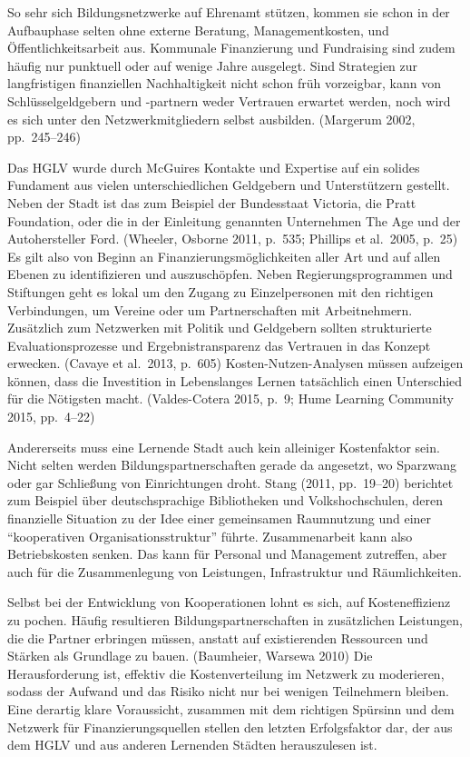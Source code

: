 \documentclass[a4paper,
fontsize=11pt,
oneside,
numbers=noperiodatend,
parskip=half-,
bibliography=totoc,
final
]{scrartcl}
\begin{document}
So sehr sich Bildungsnetzwerke auf Ehrenamt stützen, kommen sie schon in
der Aufbauphase selten ohne externe Beratung, Managementkosten, und
Öffentlichkeitsarbeit aus. Kommunale Finanzierung und Fundraising sind
zudem häufig nur punktuell oder auf wenige Jahre ausgelegt. Sind
Strategien zur langfristigen finanziellen Nachhaltigkeit nicht schon
früh vorzeigbar, kann von Schlüsselgeldgebern und -partnern weder
Vertrauen erwartet werden, noch wird es sich unter den
Netzwerkmitgliedern selbst ausbilden. (Margerum 2002, pp.~245--246)

Das HGLV wurde durch McGuires Kontakte und Expertise auf ein solides
Fundament aus vielen unterschiedlichen Geldgebern und Unterstützern
gestellt. Neben der Stadt ist das zum Beispiel der Bundesstaat Victoria,
die Pratt Foundation, oder die in der Einleitung genannten Unternehmen
The Age und der Autohersteller Ford. (Wheeler, Osborne 2011, p.~535;
Phillips et al.~2005, p.~25) Es gilt also von Beginn an
Finanzierungsmöglichkeiten aller Art und auf allen Ebenen zu
identifizieren und auszuschöpfen. Neben Regierungsprogrammen und
Stiftungen geht es lokal um den Zugang zu Einzelpersonen mit den
richtigen Verbindungen, um Vereine oder um Partnerschaften mit
Arbeitnehmern. Zusätzlich zum Netzwerken mit Politik und Geldgebern
sollten strukturierte Evaluationsprozesse und Ergebnistransparenz das
Vertrauen in das Konzept erwecken. (Cavaye et al.~2013, p.~605)
Kosten-Nutzen-Analysen müssen aufzeigen können, dass die Investition in
Lebenslanges Lernen tatsächlich einen Unterschied für die Nötigsten
macht. (Valdes-Cotera 2015, p.~9; Hume Learning Community 2015,
pp.~4--22)

Andererseits muss eine Lernende Stadt auch kein alleiniger Kostenfaktor
sein. Nicht selten werden Bildungspartnerschaften gerade da angesetzt,
wo Sparzwang oder gar Schließung von Einrichtungen droht. Stang (2011,
pp.~19--20) berichtet zum Beispiel über deutschsprachige Bibliotheken
und Volkshochschulen, deren finanzielle Situation zu der Idee einer
gemeinsamen Raumnutzung und einer \enquote{kooperativen
Organisationsstruktur} führte. Zusammenarbeit kann also Betriebskosten
senken. Das kann für Personal und Management zutreffen, aber auch für
die Zusammenlegung von Leistungen, Infrastruktur und Räumlichkeiten.

Selbst bei der Entwicklung von Kooperationen lohnt es sich, auf
Kosteneffizienz zu pochen. Häufig resultieren Bildungspartnerschaften in
zusätzlichen Leistungen, die die Partner erbringen müssen, anstatt auf
existierenden Ressourcen und Stärken als Grundlage zu bauen. (Baumheier,
Warsewa 2010) Die Herausforderung ist, effektiv die Kostenverteilung im
Netzwerk zu moderieren, sodass der Aufwand und das Risiko nicht nur bei
wenigen Teilnehmern bleiben. Eine derartig klare Voraussicht, zusammen
mit dem richtigen Spürsinn und dem Netzwerk für Finanzierungsquellen
stellen den letzten Erfolgsfaktor dar, der aus dem HGLV und aus anderen
Lernenden Städten herauszulesen ist.
\end{document}
